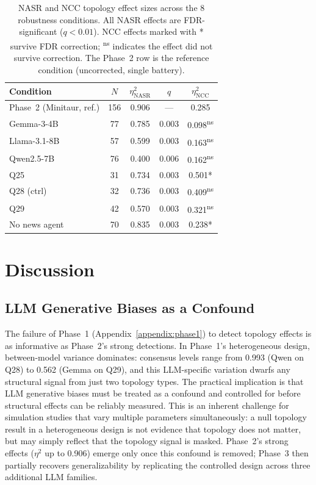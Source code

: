 \documentclass[11pt]{article}
\begin{document}
\begin{table}[t]
\centering
\small
\begin{tabular}{l c c c c}
\toprule
Condition & $N$ & $\eta^2_{\text{NASR}}$ & $q$ & $\eta^2_{\text{NCC}}$ \\
\midrule
Phase~2 (Minitaur, ref.) & 156 & 0.906 & --- & 0.285 \\
\midrule
Gemma-3-4B   & 77 & 0.785 & 0.003 & 0.098\textsuperscript{ns} \\
Llama-3.1-8B & 57 & 0.599 & 0.003 & 0.163\textsuperscript{ns} \\
Qwen2.5-7B   & 76 & 0.400 & 0.006 & 0.162\textsuperscript{ns} \\
\midrule
Q25 & 31 & 0.734 & 0.003 & 0.501* \\
Q28 (ctrl) & 32 & 0.736 & 0.003 & 0.409\textsuperscript{ns} \\
Q29 & 42 & 0.570 & 0.003 & 0.321\textsuperscript{ns} \\
\midrule
No news agent & 70 & 0.835 & 0.003 & 0.238* \\
\bottomrule
\end{tabular}
\caption{NASR and NCC topology effect sizes across the 8 robustness conditions. All NASR effects are FDR-significant ($q < 0.01$). NCC effects marked with * survive FDR correction; \textsuperscript{ns} indicates the effect did not survive correction. The Phase~2 row is the reference condition (uncorrected, single battery).}
\label{tab:robustness_summary}
\end{table}

\section{Discussion}
\label{sec:discussion}

\subsection{LLM Generative Biases as a Confound}

The failure of Phase~1 (Appendix~\ref{appendix:phase1}) to detect topology effects is as informative as Phase~2's strong detections. In Phase~1's heterogeneous design, between-model variance dominates: consensus levels range from 0.993 (Qwen on Q28) to 0.562 (Gemma on Q29), and this LLM-specific variation dwarfs any structural signal from just two topology types. The practical implication is that LLM generative biases must be treated as a confound and controlled for before structural effects can be reliably measured. This is an inherent challenge for simulation studies that vary multiple parameters simultaneously: a null topology result in a heterogeneous design is not evidence that topology does not matter, but may simply reflect that the topology signal is masked. Phase~2's strong effects ($\eta^2$ up to 0.906) emerge only once this confound is removed; Phase~3 then partially recovers generalizability by replicating the controlled design across three additional LLM families.
\end{document}
